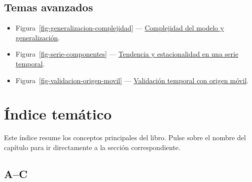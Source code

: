 \documentclass[
  spanish,
  10.5pt,
  letterpaper,
  DIV=11,
  numbers=noendperiod,
  oneside,
  open=any]{scrreprt}
\providecommand{\tightlist}{%
  \setlength{\itemsep}{0pt}\setlength{\parskip}{0pt}}
\theoremstyle{definition}
\theoremstyle{definition}
\theoremstyle{plain}
\theoremstyle{remark}
\begin{document}
\section*{Temas avanzados}\label{temas-avanzados-1}


\begin{itemize}
\tightlist
\item
  Figura~\ref{fig-generalizacion-complejidad} ---
  \hyperref[fig-generalizacion-complejidad]{Complejidad del modelo y
  generalización}.
\item
  Figura~\ref{fig-serie-componentes} ---
  \hyperref[fig-serie-componentes]{Tendencia y estacionalidad en una
  serie temporal}.
\item
  Figura~\ref{fig-validacion-origen-movil} ---
  \hyperref[fig-validacion-origen-movil]{Validación temporal con origen
  móvil}.
\end{itemize}


\chapter*{Índice temático}\label{uxedndice-temuxe1tico}


Este índice resume los conceptos principales del libro. Pulse sobre el
nombre del capítulo para ir directamente a la sección correspondiente.

\section*{A--C}\label{ac-1}

\end{document}

